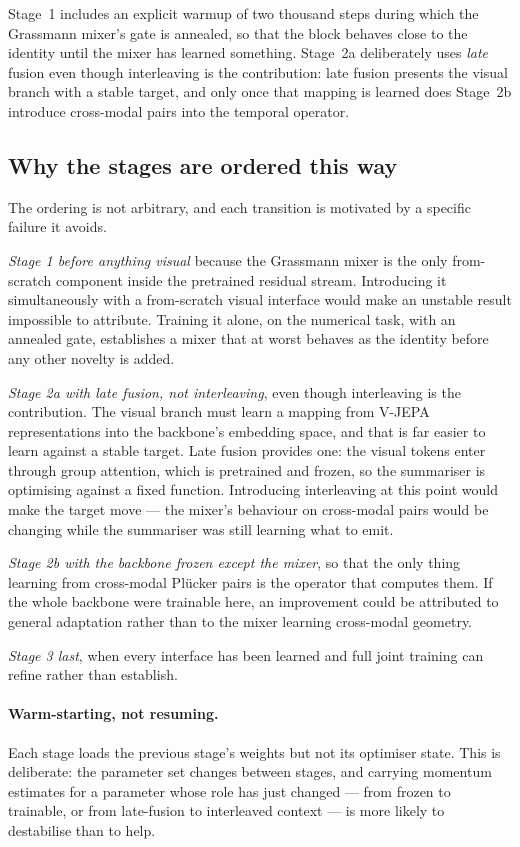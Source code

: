 Stage~1 includes an explicit warmup of two thousand steps during which the Grassmann mixer's
gate is annealed, so that the block behaves close to the identity until the mixer has learned
something. Stage~2a deliberately uses \emph{late} fusion even though interleaving is the
contribution: late fusion presents the visual branch with a stable target, and only once that
mapping is learned does Stage~2b introduce cross-modal pairs into the temporal operator.

\subsection{Why the stages are ordered this way}

The ordering is not arbitrary, and each transition is motivated by a specific failure it
avoids.

\emph{Stage 1 before anything visual} because the Grassmann mixer is the only from-scratch
component inside the pretrained residual stream. Introducing it simultaneously with a
from-scratch visual interface would make an unstable result impossible to attribute. Training
it alone, on the numerical task, with an annealed gate, establishes a mixer that at worst
behaves as the identity before any other novelty is added.

\emph{Stage 2a with late fusion, not interleaving}, even though interleaving is the
contribution. The visual branch must learn a mapping from V-JEPA representations into the
backbone's embedding space, and that is far easier to learn against a stable target. Late
fusion provides one: the visual tokens enter through group attention, which is pretrained and
frozen, so the summariser is optimising against a fixed function. Introducing interleaving at
this point would make the target move --- the mixer's behaviour on cross-modal pairs would be
changing while the summariser was still learning what to emit.

\emph{Stage 2b with the backbone frozen except the mixer}, so that the only thing learning
from cross-modal Pl\"ucker pairs is the operator that computes them. If the whole backbone were
trainable here, an improvement could be attributed to general adaptation rather than to the
mixer learning cross-modal geometry.

\emph{Stage 3 last}, when every interface has been learned and full joint training can refine
rather than establish.

\paragraph{Warm-starting, not resuming.} Each stage loads the previous stage's weights but
not its optimiser state. This is deliberate: the parameter set changes between stages, and
carrying momentum estimates for a parameter whose role has just changed --- from frozen to
trainable, or from late-fusion to interleaved context --- is more likely to destabilise than
to help.

